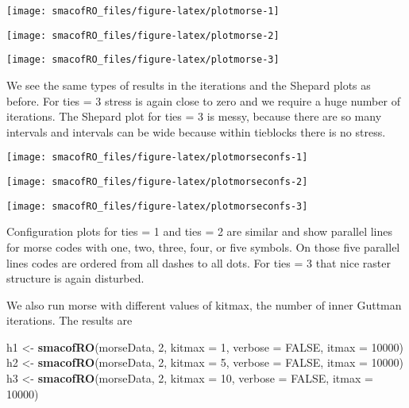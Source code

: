 \documentclass[
  12pt,
]{article}
\newenvironment{Shaded}{\begin{snugshade}}{\end{snugshade}}
\newcommand{\AttributeTok}[1]{\textcolor[rgb]{0.13,0.29,0.53}{#1}}
\newcommand{\ConstantTok}[1]{\textcolor[rgb]{0.56,0.35,0.01}{#1}}
\newcommand{\DecValTok}[1]{\textcolor[rgb]{0.00,0.00,0.81}{#1}}
\newcommand{\FunctionTok}[1]{\textcolor[rgb]{0.13,0.29,0.53}{\textbf{#1}}}
\newcommand{\NormalTok}[1]{#1}
\newcommand{\OtherTok}[1]{\textcolor[rgb]{0.56,0.35,0.01}{#1}}
\begin{document}
\begin{center}\texttt{[image: smacofRO\_files/figure-latex/plotmorse-1]} \end{center}

\begin{center}\texttt{[image: smacofRO\_files/figure-latex/plotmorse-2]} \end{center}

\begin{center}\texttt{[image: smacofRO\_files/figure-latex/plotmorse-3]} \end{center}

We see the same types of results in the iterations and the Shepard plots as before. For ties = 3
stress is again close to zero and we require a huge number of iterations. The Shepard plot
for ties = 3 is messy, because there are so many intervals and intervals can be wide because
within tieblocks there is no stress.

\begin{center}\texttt{[image: smacofRO\_files/figure-latex/plotmorseconfs-1]} \end{center}

\begin{center}\texttt{[image: smacofRO\_files/figure-latex/plotmorseconfs-2]} \end{center}

\begin{center}\texttt{[image: smacofRO\_files/figure-latex/plotmorseconfs-3]} \end{center}

Configuration plots for ties = 1 and ties = 2 are similar and show parallel lines for morse codes
with one, two, three, four, or five symbols. On those five parallel lines codes are ordered from
all dashes to all dots. For ties = 3 that nice raster structure is again disturbed.

We also run morse with different values of kitmax, the number of inner Guttman iterations. The results are

\begin{Shaded}
\begin{Highlighting}[]
\NormalTok{h1 }\OtherTok{\textless{}{-}} \FunctionTok{smacofRO}\NormalTok{(morseData, }\DecValTok{2}\NormalTok{, }\AttributeTok{kitmax =} \DecValTok{1}\NormalTok{, }\AttributeTok{verbose =} \ConstantTok{FALSE}\NormalTok{, }\AttributeTok{itmax =} \DecValTok{10000}\NormalTok{)}
\NormalTok{h2 }\OtherTok{\textless{}{-}} \FunctionTok{smacofRO}\NormalTok{(morseData, }\DecValTok{2}\NormalTok{, }\AttributeTok{kitmax =} \DecValTok{5}\NormalTok{, }\AttributeTok{verbose =} \ConstantTok{FALSE}\NormalTok{, }\AttributeTok{itmax =} \DecValTok{10000}\NormalTok{)}
\NormalTok{h3 }\OtherTok{\textless{}{-}} \FunctionTok{smacofRO}\NormalTok{(morseData, }\DecValTok{2}\NormalTok{, }\AttributeTok{kitmax =} \DecValTok{10}\NormalTok{, }\AttributeTok{verbose =} \ConstantTok{FALSE}\NormalTok{, }\AttributeTok{itmax =} \DecValTok{10000}\NormalTok{)}
\end{Highlighting}
\end{Shaded}
\end{document}
